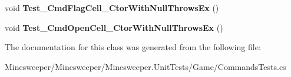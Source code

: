 \begin{DoxyCompactItemize}
\item 
\hypertarget{class_minesweeper_1_1_unit_tests_1_1_game_1_1_commands_1_1_commands_tests_aedb9474380b16ce63f0d2986975a0154}{void {\bfseries Test\+\_\+\+Cmd\+Flag\+Cell\+\_\+\+Ctor\+With\+Null\+Throws\+Ex} ()}\label{class_minesweeper_1_1_unit_tests_1_1_game_1_1_commands_1_1_commands_tests_aedb9474380b16ce63f0d2986975a0154}

\item 
\hypertarget{class_minesweeper_1_1_unit_tests_1_1_game_1_1_commands_1_1_commands_tests_aa130704d7271e93eb314ff3d1efe4a0f}{void {\bfseries Test\+\_\+\+Cmd\+Open\+Cell\+\_\+\+Ctor\+With\+Null\+Throws\+Ex} ()}\label{class_minesweeper_1_1_unit_tests_1_1_game_1_1_commands_1_1_commands_tests_aa130704d7271e93eb314ff3d1efe4a0f}

\end{DoxyCompactItemize}


The documentation for this class was generated from the following file\+:\begin{DoxyCompactItemize}
\item 
Minesweeper/\+Minesweeper/\+Minesweeper.\+Unit\+Tests/\+Game/Commands\+Tests.\+cs\end{DoxyCompactItemize}
